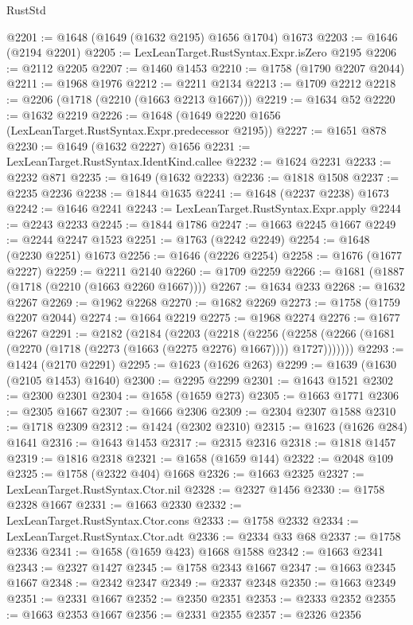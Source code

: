 \begin{lexlean}{RustStd}
\begin{coremodule}
{\begin{coremodule}
{{{{{{{{{{{{{{{{{{{{{{{{{{{{{{{{{{{{{{{{{{{{@2201 := @1648 (@1649 (@1632 @2195) @1656 @1704) @1673
@2203 := @1646 (@2194 @2201)
@2205 := LexLeanTarget.RustSyntax.Expr.isZero @2195
@2206 := @2112 @2205
@2207 := @1460 @1453
@2210 := @1758 (@1790 @2207 @2044)
@2211 := @1968 @1976
@2212 := @2211 @2134
@2213 := @1709 @2212
@2218 := @2206 (@1718 (@2210 (@1663 @2213 @1667)))
@2219 := @1634 @52
@2220 := @1632 @2219
@2226 := @1648 (@1649 @2220 @1656 (LexLeanTarget.RustSyntax.Expr.predecessor @2195))
@2227 := @1651 @878
@2230 := @1649 (@1632 @2227) @1656
@2231 := LexLeanTarget.RustSyntax.IdentKind.callee
@2232 := @1624 @2231
@2233 := @2232 @871
@2235 := @1649 (@1632 @2233)
@2236 := @1818 @1508
@2237 := @2235 @2236
@2238 := @1844 @1635
@2241 := @1648 (@2237 @2238) @1673
@2242 := @1646 @2241
@2243 := LexLeanTarget.RustSyntax.Expr.apply
@2244 := @2243 @2233
@2245 := @1844 @1786
@2247 := @1663 @2245 @1667
@2249 := @2244 @2247 @1523
@2251 := @1763 (@2242 @2249)
@2254 := @1648 (@2230 @2251) @1673
@2256 := @1646 (@2226 @2254)
@2258 := @1676 (@1677 @2227)
@2259 := @2211 @2140
@2260 := @1709 @2259
@2266 := @1681 (@1887 (@1718 (@2210 (@1663 @2260 @1667))))
@2267 := @1634 @233
@2268 := @1632 @2267
@2269 := @1962 @2268
@2270 := @1682 @2269
@2273 := @1758 (@1759 @2207 @2044)
@2274 := @1664 @2219
@2275 := @1968 @2274
@2276 := @1677 @2267
@2291 := @2182
    (@2184
      (@2203
        (@2218
          (@2256
            (@2258 (@2266 (@1681 (@2270 (@1718 (@2273 (@1663 (@2275 @2276) @1667)))) @1727)))))))
@2293 := @1424 (@2170 @2291)
@2295 := @1623 (@1626 @263)
@2299 := @1639 (@1630 (@2105 @1453) @1640)
@2300 := @2295 @2299
@2301 := @1643 @1521
@2302 := @2300 @2301
@2304 := @1658 (@1659 @273)
@2305 := @1663 @1771
@2306 := @2305 @1667
@2307 := @1666 @2306
@2309 := @2304 @2307 @1588
@2310 := @1718 @2309
@2312 := @1424 (@2302 @2310)
@2315 := @1623 (@1626 @284) @1641
@2316 := @1643 @1453
@2317 := @2315 @2316
@2318 := @1818 @1457
@2319 := @1816 @2318
@2321 := @1658 (@1659 @144)
@2322 := @2048 @109
@2325 := @1758 (@2322 @404) @1668
@2326 := @1663 @2325
@2327 := LexLeanTarget.RustSyntax.Ctor.nil
@2328 := @2327 @1456
@2330 := @1758 @2328 @1667
@2331 := @1663 @2330
@2332 := LexLeanTarget.RustSyntax.Ctor.cons
@2333 := @1758 @2332
@2334 := LexLeanTarget.RustSyntax.Ctor.adt
@2336 := @2334 @33 @68
@2337 := @1758 @2336
@2341 := @1658 (@1659 @423) @1668 @1588
@2342 := @1663 @2341
@2343 := @2327 @1427
@2345 := @1758 @2343 @1667
@2347 := @1663 @2345 @1667
@2348 := @2342 @2347
@2349 := @2337 @2348
@2350 := @1663 @2349
@2351 := @2331 @1667
@2352 := @2350 @2351
@2353 := @2333 @2352
@2355 := @1663 @2353 @1667
@2356 := @2331 @2355
@2357 := @2326 @2356
}}}}}}}}}}}}}}}}}}}}}}}}}}}}}}}}}}}}}}}}}}}}
\end{coremodule}}
\end{coremodule}
\end{lexlean}
